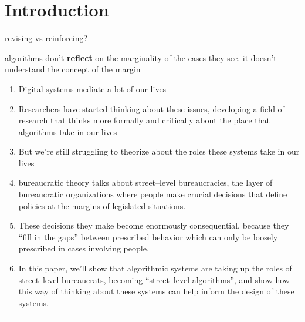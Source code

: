 \documentclass[main]{subfiles}
\begin{document}
\section{Introduction}



revising vs reinforcing?

algorithms don't \textbf{reflect} on the marginality of the cases they see.
it doesn't understand the concept of the margin

\begin{enumerate}
  \item {Digital systems mediate a lot of our lives}
  \item {Researchers have started thinking about these issues, developing a field of research that thinks more formally and critically about the place that algorithms take in our lives}
  \item {But we're still struggling to theorize about the roles these systems take in our lives}
  \item {bureaucratic theory talks about street--level bureaucracies, the layer of bureaucratic organizations where people make crucial decisions that define policies at the margins of legislated situations.}
  \item {These decisions they make become enormously consequential, because they ``fill in the gaps'' between prescribed behavior which can only be loosely prescribed in cases involving people.}
  \item {In this paper, we'll show that algorithmic systems are taking up the roles of street--level bureaucrats, becoming ``street--level algorithms'', and show how this way of thinking about these systems can help inform the design of these systems.}

  \par\noindent\rule{\textwidth}{0.5pt}


\end{enumerate}
\end{document}
